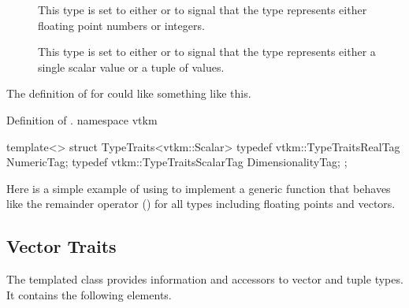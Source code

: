 \begin{description}
\item[]  This type is set to
  either  or  to signal
  that the type represents either floating point numbers or integers.
\item[]  This
  type is set to either  or
   to signal that the type represents either a
  single scalar value or a tuple of values.
\end{description}

The definition of  for  could like something
like this.
\begin{vtkmexample}{Definition of \protect {}.}
namespace vtkm {

template<>
struct TypeTraits<vtkm::Scalar>
{
  typedef vtkm::TypeTraitsRealTag NumericTag;
  typedef vtkm::TypeTraitsScalarTag DimensionalityTag;
};

}
\end{vtkmexample}

Here is a simple example of using  to implement a generic
function that behaves like the remainder operator (\textcode{\%}) for all
types including floating points and vectors.




\subsection{Vector Traits}

The  templated class provides information and
accessors to vector and tuple types. It contains the following elements.

